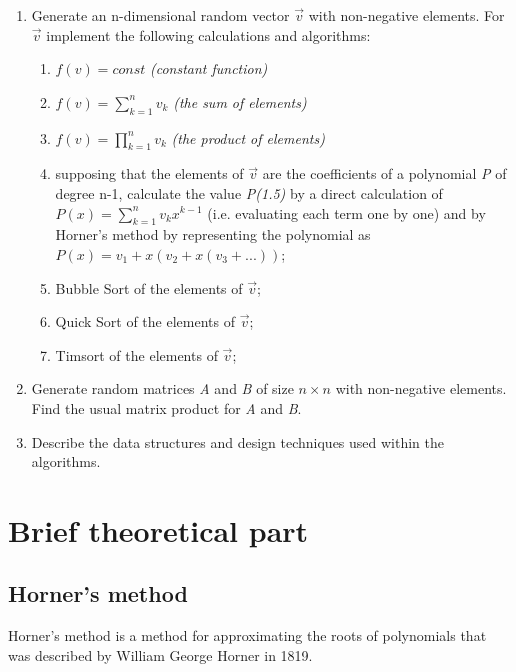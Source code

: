 \documentclass[a4paper,article,14pt]{extarticle}
\begin{document}
	\begin{enumerate}
		\item Generate an n-dimensional random vector $\vec{v}$ with non-negative elements. For $\vec{v}$  implement the following calculations and algorithms:
		\begin{enumerate}
			\item \begin{math} f(v) = const \end{math} \textit{(constant function)}
			\item \begin{math} f(v) = \sum_{k=1}^n v_k\end{math} \textit{(the sum of elements)}
			\item \begin{math} f(v) = \prod_{k=1}^n v_k\end{math} \textit{(the product of elements)}
			\item supposing that the elements of $\vec{v}$ are the coefficients of a polynomial \textit{P} of degree n-1, calculate the value \textit{P(1.5)} by a direct calculation of $P(x)=\sum_{k=1}^n v_k x^{k-1}$ (i.e. evaluating each term one by one) and by Horner’s method by representing the polynomial as $P(x)=v_1+x(v_2+x(v_3+...))$;
			\item Bubble Sort of the elements of $\vec{v}$;
			\item Quick Sort of the elements of $\vec{v}$;
			\item Timsort of the elements of $\vec{v}$;
		\end{enumerate}
		\item Generate random matrices \textit{A} and \textit{B} of size $n\times n$ with non-negative elements. Find the usual matrix product for \textit{A} and \textit{B}.
		\item Describe the data structures and design techniques used within the algorithms.
	\end{enumerate}
	
	\section{Brief theoretical part}
	\subsection{Horner's method}
	Horner's method is a method for approximating the roots of polynomials that was described by William George Horner in 1819.
	
\end{document}
